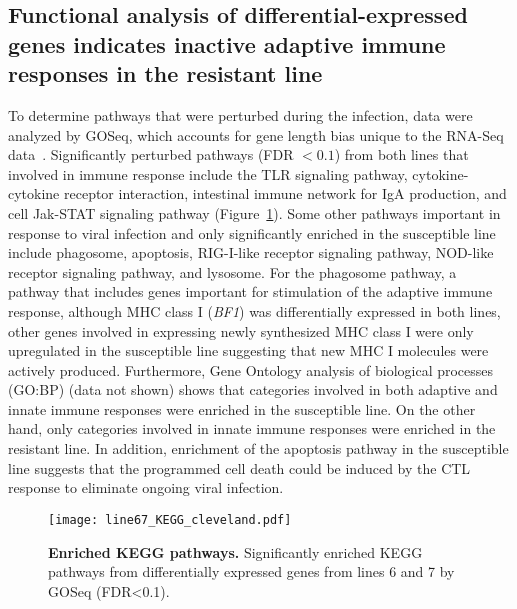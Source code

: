 \subsection{Functional analysis of differential-expressed genes
indicates inactive adaptive immune responses in the resistant
line}

To determine pathways that were perturbed during the infection,
data were analyzed by GOSeq, which accounts for gene length bias
unique to the RNA-Seq data~\cite{young2010method}.  Significantly
perturbed pathways (FDR $< 0.1$) from both lines that involved in
immune response include the TLR signaling pathway,
cytokine-cytokine receptor interaction, intestinal immune network
for IgA production, and cell Jak-STAT signaling pathway
(Figure~\ref{line67_kegg}). Some other pathways important in
response to viral infection and only significantly enriched in
the susceptible line include phagosome, apoptosis, RIG-I-like
receptor signaling pathway, NOD-like receptor signaling pathway,
and lysosome. For the phagosome pathway, a pathway that includes
genes important for stimulation of the adaptive immune response,
although MHC class I ({\em BF1}) was differentially expressed in
both lines, other genes involved in expressing newly synthesized
MHC class I were only upregulated in the susceptible line
suggesting that new MHC I molecules were actively produced.
Furthermore, Gene Ontology analysis of biological processes
(GO:BP) (data not shown) shows that categories involved in both
adaptive and innate immune responses were enriched in the
susceptible line.  On the other hand, only categories involved in
innate immune responses were enriched in the resistant line.  In
addition, enrichment of the apoptosis pathway in the susceptible
line suggests that the programmed cell death could be induced by
the CTL response to eliminate ongoing viral infection.

\begin{figure}[!ht]
    \begin{center}
        \texttt{[image: line67\_KEGG\_cleveland.pdf]}
    \end{center}
    \caption{
        \textbf{Enriched KEGG pathways.}
        Significantly enriched KEGG pathways from differentially
        expressed genes from lines 6 and 7 by GOSeq (FDR<0.1).
    }
    \label{line67_kegg}
\end{figure}


